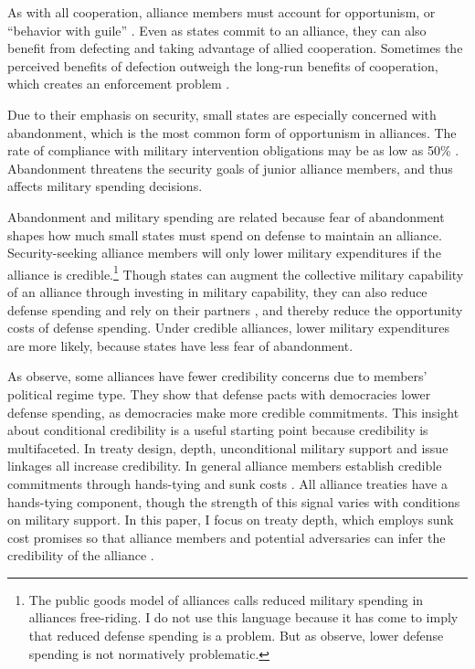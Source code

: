\documentclass[12pt]{article}
\begin{document}
As with all cooperation, alliance members must account for opportunism, or ``behavior with guile'' \citep{Williamson1985}. 
Even as states commit to an alliance, they can also benefit from defecting and taking advantage of allied cooperation. 
Sometimes the perceived benefits of defection outweigh the long-run benefits of cooperation, which creates an enforcement problem \citep{Fearon1998a, Koremenosetal2001}.


Due to their emphasis on security, small states are especially concerned with abandonment, which is the most common form of opportunism in alliances.
The rate of compliance with military intervention obligations may be as low as 50\% \citep{BerkemeierFuhrmann2018}.
Abandonment threatens the security goals of junior alliance members, and thus affects military spending decisions. 


Abandonment and military spending are related because fear of abandonment shapes how much small states must spend on defense to maintain an alliance. 
Security-seeking alliance members will only lower military expenditures if the alliance is credible.\footnote{The public goods model of alliances calls reduced military spending in alliances free-riding. I do not use this language because it has come to imply that reduced defense spending is a problem. But as \citet[pg. 278]{OlsonZeckhauser1966} observe, lower defense spending is not normatively problematic.}
Though states can augment the collective military capability of an alliance through investing in military capability, they can also reduce defense spending and rely on their partners \citep{OlsonZeckhauser1966, Morrow1993, Conybeare1994, SandlerHartley2001}, and thereby reduce the opportunity costs of defense spending. 
Under credible alliances, lower military expenditures are more likely, because states have less fear of abandonment. 


As \citet{DigiuseppePoast2016} observe, some alliances have fewer credibility concerns due to members' political regime type.
They show that defense pacts with democracies lower defense spending, as democracies make more credible commitments.
This insight about conditional credibility is a useful starting point because credibility is multifaceted. 
In treaty design, depth, unconditional military support \citep{Benson2012, Chibaetal2015} and issue linkages \citep{LongLeeds2006, Poast2012, Poast2013} all increase credibility.
In general alliance members establish credible commitments through hands-tying and sunk costs \citep{Fearon1997}. 
All alliance treaties have a hands-tying component, though the strength of this signal varies with conditions on military support. 
In this paper, I focus on treaty depth, which employs sunk cost promises so that alliance members and potential adversaries can infer the credibility of the alliance \citep{Leeds2003, FuhrmannSechser2014}. 
\end{document}
